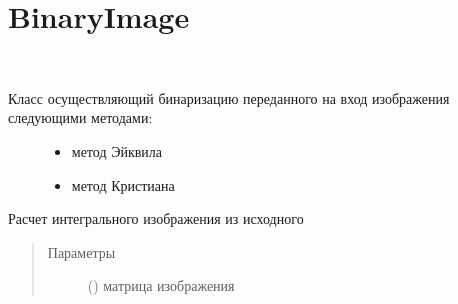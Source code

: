 \documentclass[letterpaper,10pt,russian]{sphinxmanual}
\begin{document}
\section{BinaryImage}
\label{\detokenize{BinaryImage:binaryimage}}\label{\detokenize{BinaryImage::doc}}

\begin{fulllineitems}
\label{\detokenize{BinaryImage:BinaryImage.BinaryImage}}~\begin{description}
\item[{Класс осуществляющий бинаризацию переданного на вход изображения следующими методами:}] \leavevmode\begin{itemize}
\item {} 
{\hyperref[\detokenize{BinaryImage:BinaryImage.BinaryImage.eikvil_binarisation}]{}} \textendash{} метод Эйквила

\item {} 
{\hyperref[\detokenize{BinaryImage:BinaryImage.BinaryImage.cristian_binarisation}]{}} \textendash{} метод Кристиана

\end{itemize}

\end{description}

\begin{fulllineitems}
\label{\detokenize{BinaryImage:BinaryImage.BinaryImage.calc_integ}}
Расчет интегрального изображения из исходного
\begin{quote}\begin{description}
\item[{Параметры}] \leavevmode
{} () \textendash{} матрица изображения

\end{description}\end{quote}


\end{fulllineitems}
\end{fulllineitems}
\end{document}

